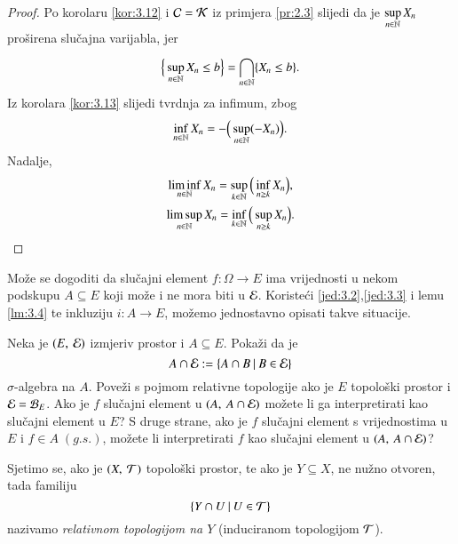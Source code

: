 \begin{proof}
    Po korolaru \ref{kor:3.12} i $\mathcal{C} = \mathcal{K}$ iz primjera \ref{pr:2.3} slijedi da je $\sup\limits_{n \in \mathbb{N}} X_n$ pro\v sirena slu\v cajna varijabla, jer
    \begin{equation*}
        \Big\{ \sup\limits_{n \in \mathbb{N}} X_n \leq b \Big\} = \bigcap\limits_{n \in \mathbb{N}}^{} \{ X_n \leq b \}.
    \end{equation*}
    Iz korolara \ref{kor:3.13} slijedi tvrdnja za infimum, zbog
    \begin{equation*}
        \inf\limits_{n \in \mathbb{N}} X_n = - \Big(\sup\limits_{n \in \mathbb{N}} (- X_n) \Big).
    \end{equation*}
    Nadalje,
    \begin{equation*}
        \begin{gathered}
            \liminf\limits_{n \in \mathbb{N}} X_n = \sup\limits_{k \in \mathbb{N}} \Big(\inf\limits_{n \geq k} X_n \Big),\\
            \limsup\limits_{n \in \mathbb{N}} X_n = \inf\limits_{k \in \mathbb{N}} \Big( \sup\limits_{n\geq k} X_n \Big).
        \end{gathered}
    \end{equation*}
\end{proof}

Mo\v ze se dogoditi da slu\v cajni element $f:\Omega \to E$ ima vrijednosti u nekom podskupu $A \subseteq E$ koji mo\v ze i ne mora biti u $\mathcal{E}$. Koriste\' ci \eqref{jed:3.2},\eqref{jed:3.3} i lemu \ref{lm:3.4} te inkluziju $i: A \to E$, mo\v zemo jednostavno opisati takve situacije.

\begin{zad} \label{zad:3.15}
    Neka je $(E, \: \mathcal{E})$ izmjeriv prostor i $A \subseteq E$.
    Poka\v zi da je
    \begin{equation*}
        A \cap \mathcal{E} := \{{A \cap B} \: | \: {B \in \mathcal{E}}\}
    \end{equation*}
    $\sigma$-algebra na $A$.
    Pove\v zi s pojmom relativne topologije ako je $E$ topolo\v ski prostor i $\mathcal{E} = \mathcal{B}_{E}$.
    Ako je $f$ slu\v cajni element u $(A, \: A \cap \mathcal{E})$ mo\v zete li ga interpretirati kao slu\v cajni element u $E$?
    S druge strane, ako je $f$ slu\v cajni element s vrijednostima u $E$ i $f \in A \; (g.s.)$, mo\v zete li interpretirati $f$ kao slu\v cajni element u $({A}, \: {A \cap \mathcal{E}})$?
\end{zad}

\begin{nap} \label{nap:3.15-1}
    Sjetimo se, ako je $({X}, \: {\mathcal{T}})$ topolo\v ski prostor, te ako je $Y \subseteq X$, ne nu\v zno otvoren, tada familiju
    \begin{equation*}
        \{{Y \cap U} \: | \: {U \in \mathcal{T}}\}
    \end{equation*}
    nazivamo \emph{relativnom topologijom na $Y$} (induciranom topologijom $\mathcal{T}$).
\end{nap}

